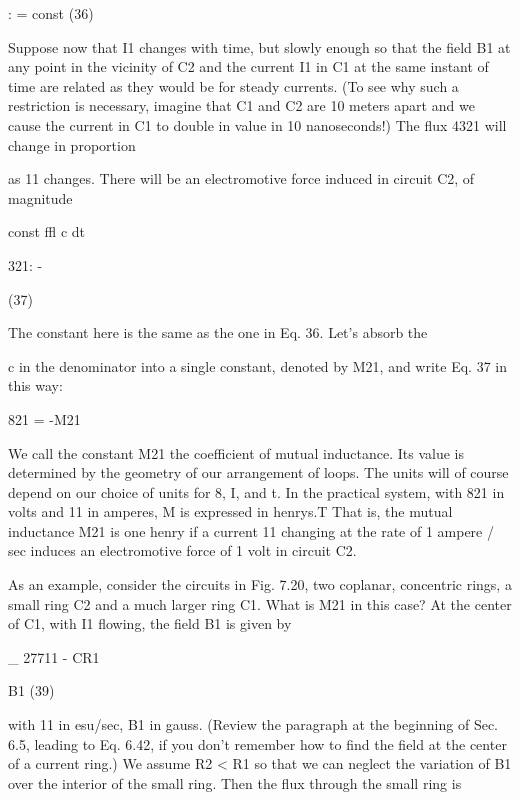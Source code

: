 \begin{equation}
\end{equation}
: = const (36)

Suppose now that I1 changes with time, but slowly enough so that
the field B1 at any point in the vicinity of C2 and the current I1 in C1
at the same instant of time are related as they would be for steady
currents. (To see why such a restriction is necessary, imagine that C1
and C2 are 10 meters apart and we cause the current in C1 to double in
value in 10 nanoseconds!) The flux 4321 will change in proportion

as 11 changes. There will be an electromotive force induced in
circuit C2, of magnitude

\begin{equation}
\end{equation}
const ffl
c dt

321: -

(37)

The constant here is the same as the one in Eq. 36. Let's absorb the

c in the denominator into a single constant, denoted by M21, and write
Eq. 37 in this way:

\begin{equation}
\end{equation}
821 = -M21%

We call the constant M21 the coefficient of mutual inductance. Its
value is determined by the geometry of our arrangement of loops.
The units will of course depend on our choice of units for 8, I, and t.
In the practical system, with 821 in volts and 11 in amperes, M is expressed
in henrys.T That is, the mutual inductance M21 is one henry
if a current 11 changing at the rate of 1 ampere / sec induces an electromotive
force of 1 volt in circuit C2.

As an example, consider the circuits in Fig. 7.20, two coplanar,
concentric rings, a small ring C2 and a much larger ring C1. What
is M21 in this case? At the center of C1, with I1 flowing, the field B1
is given by

\begin{equation}
\end{equation}
_ 27711
- CR1

B1 (39)

with 11 in esu/sec, B1 in gauss. (Review the paragraph at the beginning
of Sec. 6.5, leading to Eq. 6.42, if you don't remember how to
find the field at the center of a current ring.) We assume R2 < R1
so that we can neglect the variation of B1 over the interior of the small
ring. Then the flux through the small ring is

